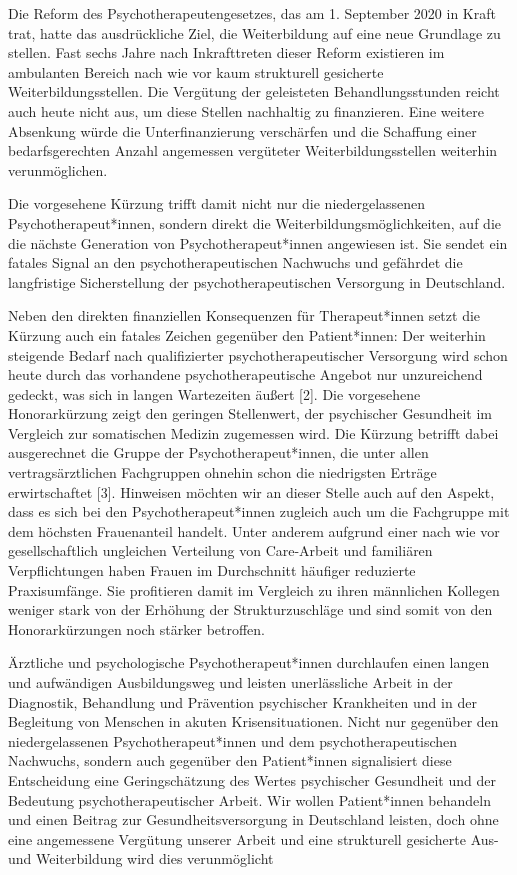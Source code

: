 \documentclass[DIV=calc]{scrartcl}
\begin{document}
Die Reform des Psychotherapeutengesetzes, das am 1. September 2020 in Kraft trat, hatte das 
ausdrückliche Ziel, die Weiterbildung auf eine neue Grundlage zu stellen. Fast sechs Jahre nach 
Inkrafttreten dieser Reform existieren im ambulanten Bereich nach wie vor kaum strukturell gesicherte 
Weiterbildungsstellen. Die Vergütung der geleisteten Behandlungsstunden reicht auch heute nicht aus, 
um diese Stellen nachhaltig zu finanzieren. Eine weitere Absenkung würde die Unterfinanzierung 
verschärfen und die Schaffung einer bedarfsgerechten Anzahl angemessen vergüteter 
Weiterbildungsstellen weiterhin verunmöglichen.

Die vorgesehene Kürzung trifft damit nicht nur die niedergelassenen Psychotherapeut*innen, sondern 
direkt die Weiterbildungsmöglichkeiten, auf die die nächste Generation von Psychotherapeut*innen 
angewiesen ist. Sie sendet ein fatales Signal an den psychotherapeutischen Nachwuchs und gefährdet die 
langfristige Sicherstellung der psychotherapeutischen Versorgung in Deutschland.

Neben den direkten finanziellen Konsequenzen für Therapeut*innen setzt die Kürzung auch ein fatales 
Zeichen gegenüber den Patient*innen: Der weiterhin steigende Bedarf nach qualifizierter 
psychotherapeutischer Versorgung wird schon heute durch das vorhandene psychotherapeutische 
Angebot nur unzureichend gedeckt, was sich in langen Wartezeiten äußert [2]. Die vorgesehene 
Honorarkürzung zeigt den geringen Stellenwert, der psychischer Gesundheit im Vergleich zur somatischen 
Medizin zugemessen wird. Die Kürzung betrifft dabei ausgerechnet die Gruppe der Psychotherapeut*innen, die unter allen vertragsärztlichen Fachgruppen ohnehin schon die niedrigsten 
Erträge erwirtschaftet [3]. Hinweisen möchten wir an dieser Stelle auch auf den Aspekt, dass es sich bei 
den Psychotherapeut*innen zugleich auch um die Fachgruppe mit dem höchsten Frauenanteil handelt. 
Unter anderem aufgrund einer nach wie vor gesellschaftlich ungleichen Verteilung von Care-Arbeit und 
familiären Verpflichtungen haben Frauen im Durchschnitt häufiger reduzierte Praxisumfänge. Sie 
profitieren damit im Vergleich zu ihren männlichen Kollegen weniger stark von der Erhöhung der 
Strukturzuschläge und sind somit von den Honorarkürzungen noch stärker betroffen. 

Ärztliche und psychologische Psychotherapeut*innen durchlaufen einen langen und aufwändigen 
Ausbildungsweg und leisten unerlässliche Arbeit in der Diagnostik, Behandlung und Prävention 
psychischer Krankheiten und in der Begleitung von Menschen in akuten Krisensituationen. Nicht nur 
gegenüber den niedergelassenen Psychotherapeut*innen und dem psychotherapeutischen Nachwuchs, 
sondern auch gegenüber den Patient*innen signalisiert diese Entscheidung eine Geringschätzung des 
Wertes psychischer Gesundheit und der Bedeutung psychotherapeutischer Arbeit. Wir wollen 
Patient*innen behandeln und einen Beitrag zur Gesundheitsversorgung in Deutschland leisten, doch ohne 
eine angemessene Vergütung unserer Arbeit und eine strukturell gesicherte Aus- und Weiterbildung wird 
dies verunmöglicht
\end{document}
